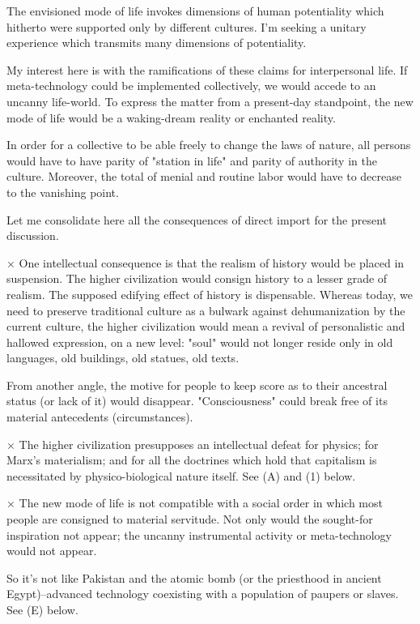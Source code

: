 \begin{enumerate}[label=\alph*.]
The envisioned mode of life invokes dimensions of human potentiality which hitherto were supported only by different cultures. I'm seeking a unitary experience which transmits many dimensions of potentiality.

My interest here is with the ramifications of these claims for interpersonal life. If meta-technology could be implemented collectively, we would accede to an uncanny life-world. To express the matter from a present-day standpoint, the new mode of life would be a waking-dream reality or enchanted reality.

In order for a collective to be able freely to change the laws of nature, all persons would have to have parity of "station in life" and parity of authority in the culture. Moreover, the total of menial and routine labor would have to decrease to the vanishing point.

Let me consolidate here all the consequences of direct import for the present discussion.

×	One intellectual consequence is that the realism of history would be placed in suspension. The higher civilization would consign history to a lesser grade of realism. The supposed edifying effect of history is dispensable. Whereas today, we need to preserve traditional culture as a bulwark against dehumanization by the current culture, the higher civilization would mean a revival of personalistic and hallowed expression, on a new level: "soul" would not longer reside only in old languages, old buildings, old statues, old texts.

From another angle, the motive for people to keep score as to their ancestral status (or lack of it) would disappear. "Consciousness" could break free of its material antecedents (circumstances).

×	The higher civilization presupposes an intellectual defeat for physics; for Marx’s materialism; and for all the doctrines which hold that capitalism is necessitated by physico-biological nature itself. See (A) and (1) below.

×	The new mode of life is not compatible with a social order in which most people are consigned to material servitude. Not only would the sought-for inspiration not appear; the uncanny instrumental activity or meta-technology would not appear.

So it's not like Pakistan and the atomic bomb (or the priesthood in ancient Egypt)–advanced technology coexisting with a population of paupers or slaves. See (E) below.


\end{enumerate}
